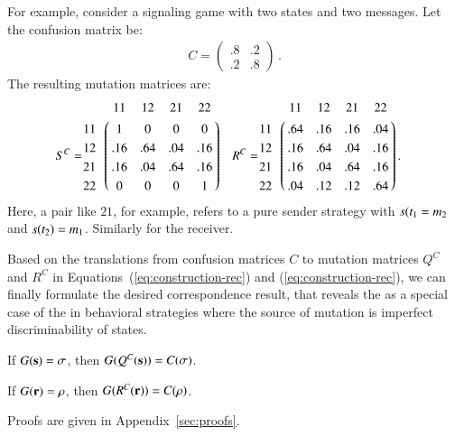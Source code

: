 For example, consider a signaling game with two states and two
messages. Let the confusion matrix be:
\begin{align*}
  C=
  \begin{pmatrix}
    .8 & .2 \\
    .2 & .8 
  \end{pmatrix}\,.
\end{align*}
The resulting mutation matrices are:
\begin{align*}
S^C & = \bordermatrix{ ~ & 11 & 12 & 21 & 22 \cr
                      11 & 1 & 0 & 0 & 0 \cr
                      12 & .16 & .64 & .04 & .16 \cr
                      21 & .16 & .04 & .64 & .16 \cr
                      22 & 0 & 0 & 0 & 1 \cr}
&                    
  R^C & = \bordermatrix{ ~ & 11 & 12 & 21 & 22 \cr
                      11 & .64 & .16 & .16 & .04 \cr
                      12 & .16 & .64 & .04 & .16 \cr
                      21 & .16 & .04 & .64 & .16 \cr
                      22 & .04 & .12 & .12 & .64 \cr}\,.
\end{align*}
Here, a pair like $21$, for example, refers to a pure sender strategy
with $s(t_1=m_2$ and $s(t_2) =
m_1$. Similarly for the receiver.

Based on the translations from confusion matrices $C$ to mutation
matrices $Q^C$ and $R^C$ in Equations~(\ref{eq:construction-rec}) and
(\ref{eq:construction-rec}), we can finally formulate the
desired correspondence result, that reveals the \rdd as a special case
of the \rmd in behavioral strategies where the source of mutation is
imperfect discriminability of states.

\begin{theorem}
  \label{thm:sender-eq}
  If $G(\mathrm{\mathbf{s}}) = \sigma$, then $G(Q^C(\mathrm{\mathbf{s}})) = C(\sigma)$.
\end{theorem}


\begin{theorem}
  \label{thm:receiver-eq}
  If $G(\mathrm{\mathbf{r}}) = \rho$, then $G(R^C(\mathrm{\mathbf{r}})) = C(\rho)$.
\end{theorem}

\noindent Proofs are given in Appendix~\ref{sec:proofs}.




